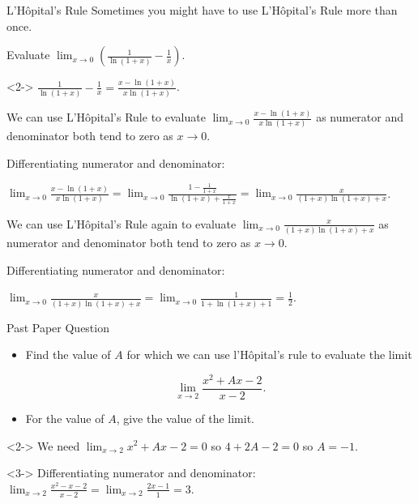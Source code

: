 \documentclass[8pt]{beamer}
\begin{document}
\begin{frame}{L'H\^opital's Rule}
	Sometimes you might have to use L'H\^opital's Rule more than once.

	\begin{problem}
		Evaluate $\lim_{x \to 0} \left( \frac{1}{\ln(1+x)}-\frac{1}{x} \right) $.

	\end{problem}
	\begin{solution}<2->
		$\frac{1}{\ln(1+x)}-\frac{1}{x}=\frac{x-\ln(1+x)}{x\ln(1+x)}$.

		We can use L'H\^opital's Rule to evaluate $\lim_{x \to 0} \frac{x-\ln (1+x)}{ x\ln(1+x)}$ as numerator and denominator both tend to zero as $x \to 0$.

		Differentiating numerator and denominator:

		$\lim_{x \to 0} \frac{x-\ln(1+x)}{x\ln(1+x)}=\lim_{x \to 0} \frac{1-\frac{1}{1+x}}{\ln(1+x)+\frac{x}{1+x}}=\lim_{x \to 0} \frac{x}{(1+x)\ln(1+x)+x}$.

		We can use L'H\^opital's Rule again to evaluate $\lim_{x \to 0} \frac{x}{(1+x)\ln(1+x)+x}$ as numerator and denominator both tend to zero as $x \to 0$.

		Differentiating numerator and denominator:

		$\lim_{x \to 0} \frac{x}{(1+x)\ln(1+x)+x}=\lim_{x \to 0} \frac{1}{1+\ln(1+x)+1}=\frac{1}{2}$.
	\end{solution}
\end{frame}

\begin{frame}{Past Paper Question}
	\begin{problem}
		\begin{itemize}
			\item Find the value of $A$ for which we can use l'H\^opital's rule to evaluate the limit

				\[
				\lim_{x \to 2} \frac{x^2+Ax-2}{x-2}.
			\]
			\item For the value of $A$, give the value of the limit.
		\end{itemize}
	\end{problem}

	\begin{solution}<2->
		We need $\lim_{x \to 2} x^2+Ax-2=0$ so $4+2A-2=0$ so $A =-1$.
	\end{solution}
	\begin{solution}<3->
		Differentiating numerator and denominator: $\lim_{x \to 2} \frac{x^2-x-2}{x-2}=\lim_{x \to 2} \frac{2x-1}{1}=3$.
	\end{solution}
	
\end{frame}
\end{document}
